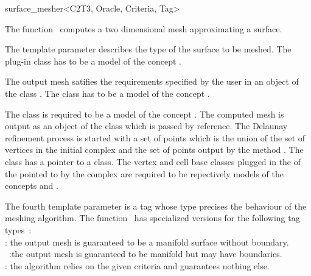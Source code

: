 

\begin{ccRefFunction}{surface_mesher<C2T3, Oracle,
Criteria, Tag>}  %


\ccDefinition
  
The function \ccRefName\ computes a two dimensional mesh 
approximating  a surface.

The template parameter  describes the type of the 
surface  to be meshed.
The plug-in class 
has to be a model of the concept .

The output mesh satifies the requirements specified by the user
in an object of the class .
The class  has to be
a model of the concept .

 The class 
is required to be a model of the concept
.
The  computed  mesh is output as an object  of the class 
which is passed by reference.
The Delaunay refinement
process is started with a set of points which is the union of the
set of vertices in the initial complex  and the set of
points output by the method .
The class  has a pointer to 
a  class.
The vertex and cell base classes plugged 
in the  of the
 pointed to by the 
complex are required  to be repectively  models  of the concepts 
 and 
.

The fourth template parameter is a tag whose type precises the behaviour of the
meshing algorithm. The function \ccRefName\  has specialized versions
for the following  tag types~: \\
 : the output mesh is guaranteed to be a manifold
surface without boundary.\\
~:the output mesh is guaranteed to be
manifold but may have boundaries.\\
 : the algorithm relies on the given criteria and
guarantees nothing else.




\end{ccRefFunction}
